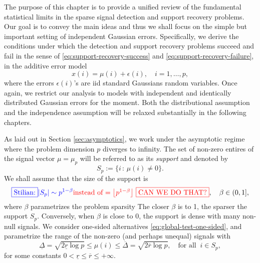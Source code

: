 
The purpose of this chapter is to provide a unified review of the fundamental statistical limits in the 
sparse signal detection and support recovery problems.  Our goal is to convey the main ideas and thus we shall focus on 
the simple but important setting of independent Gaussian errors.
Specifically, we derive the conditions under which the detection and support recovery problems succeed and fail in the sense of \eqref{eq:support-recovery-success} and \eqref{eq:support-recovery-failure}, in the additive error model 
\begin{equation} \label{eq:model-additive-Chapter3}
    x(i) = \mu(i) + \epsilon(i), \quad i=1,\ldots,p,
\end{equation}
where the errors $\epsilon(i)$'s are \ac{iid} standard Gaussians random variables.
Once again, we restrict our analysis to models with independent and identically distributed Gaussian errors for the 
moment. Both the distributional assumption and the independence assumption will be relaxed substantially in the following chapters.

As laid out in Section \ref{sec:asymptotics}, we work under the asymptotic regime where the problem dimension 
$p$ diverges to infinity.  The set of non-zero entires of the signal vector $\mu = \mu_p$ will be referred
to as its {\em support} and denoted by 
$$
 S_p:=\{i\, :\, \mu(i)\not = 0\}.
$$
We shall assume that the size of the support is
\begin{equation} \label{eq:signal-sparsity-additive}
   {\color{blue}\fbox{Stilian:} |S_p| \sim p^{1-\beta}  }{\color{red}\mbox{instead of $= \left\lfloor p^{1-\beta} \right\rfloor$ \fbox{CAN WE DO THAT?}}}, \quad \beta\in(0,1],
\end{equation}
where $\beta$ parametrizes the problem sparsity
The closer $\beta$ is to 1, the sparser the support $S_p$.  
Conversely, when $\beta$ is close to 0, the support is dense with many non-null signals.
We consider one-sided alternatives \eqref{eq:global-test-one-sided}, and parametrize the range of the non-zero (and perhaps unequal) signals with
\begin{equation} \label{eq:signal-size-additive}
    \underline{\Delta} = \sqrt{2\underline{r}\log{p}}
    \le \mu(i) \le
    \overline{\Delta} = \sqrt{2\overline{r}\log{p}}, \quad \text{for all}\;\;i\in S_p,
\end{equation}
for some constants $0<\underline{r}\le\overline{r}\le+\infty$.


